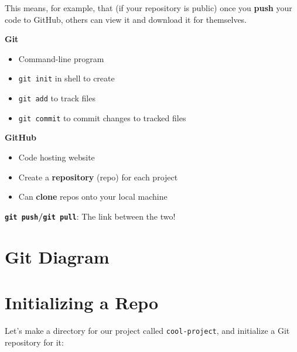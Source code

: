 \documentclass[
  letterpaper,
  DIV=11,
  numbers=noendperiod,
  oneside]{scrreprt}
\newenvironment{Shaded}{\begin{snugshade}}{\end{snugshade}}
\newcommand{\ExtensionTok}[1]{\textcolor[rgb]{0.00,0.23,0.31}{#1}}
\newcommand{\NormalTok}[1]{\textcolor[rgb]{0.00,0.23,0.31}{#1}}
\providecommand{\tightlist}{%
  \setlength{\itemsep}{0pt}\setlength{\parskip}{0pt}}\usepackage{longtable,booktabs,array}
\begin{document}
This means, for example, that (if your repository is public) once you
\textbf{push} your code to GitHub, others can view it and download it
for themselves.

\textbf{Git }

\begin{itemize}
\tightlist
\item
  Command-line program
\item
  \texttt{git\ init} in shell to create
\item
  \texttt{git\ add} to track files
\item
  \texttt{git\ commit} to commit changes to tracked files
\end{itemize}

\textbf{GitHub }

\begin{itemize}
\tightlist
\item
  Code hosting website
\item
  Create a \textbf{repository} (repo) for each project
\item
  Can \textbf{clone} repos onto your local machine
\end{itemize}

\textbf{\texttt{git\ push}/\texttt{git\ pull}}: The link between the
two!

\hypertarget{git-diagram}{%
\section{Git Diagram}\label{git-diagram}}

\hypertarget{initializing-a-repo}{%
\section{Initializing a Repo}\label{initializing-a-repo}}

Let's make a directory for our project called \texttt{cool-project}, and
initialize a Git repository for it:

\begin{Shaded}
\end{Shaded}
\end{document}
